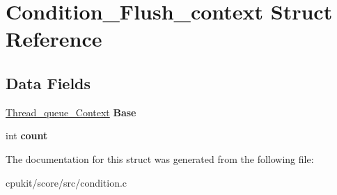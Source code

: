 \hypertarget{structCondition__Flush__context}{}\section{Condition\+\_\+\+Flush\+\_\+context Struct Reference}
\label{structCondition__Flush__context}
\subsection*{Data Fields}
\begin{DoxyCompactItemize}
\item 
\mbox{\label{structCondition__Flush__context_adcabedbe62dc236584856d603008fb6e}} 
\mbox{\hyperlink{structThread__queue__Context}{Thread\+\_\+queue\+\_\+\+Context}} {\bfseries Base}
\item 
\mbox{\label{structCondition__Flush__context_a92e2b494475700853b72a9f1f1a124a0}} 
int {\bfseries count}
\end{DoxyCompactItemize}


The documentation for this struct was generated from the following file\+:\begin{DoxyCompactItemize}
\item 
cpukit/score/src/condition.\+c\end{DoxyCompactItemize}
